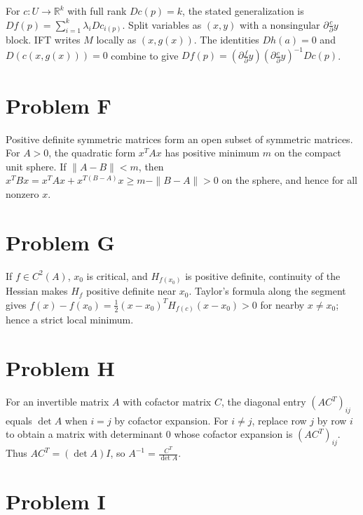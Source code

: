 For \(c:U\rightarrow\mathbb{R}^{k}\) with full rank \(Dc(p) = k\), the stated generalization is \(Df(p) = \sum_{i = 1}^{k}\lambda_{i}Dc_{i{(p)}}\). Split variables as \(\left( {x,y} \right)\) with a nonsingular \(\partial\frac{c}{\partial}y\) block. IFT writes \(M\) locally as \(\left( {x,g(x)} \right)\). The identities \(Dh(a) = 0\) and \(D\left( {c\left( {x,g(x)} \right)} \right) = 0\) combine to give \(Df(p) = \left( {\partial\frac{f}{\partial}y} \right)\left( {\partial\frac{c}{\partial}y} \right)^{- 1}Dc(p)\).

\section{Problem F}

Positive definite symmetric matrices form an open subset of symmetric matrices. For \(A > 0\), the quadratic form \(x^{T}Ax\) has positive minimum \(m\) on the compact unit sphere. If \(\| A - B\| < m\), then \(x^{T}Bx = x^{T}Ax + x^{T{({B - A})}}x \geq m - \| B - A\| > 0\) on the sphere, and hence for all nonzero \(x\).

\section{Problem G}

If \(f \in C^{2}(A)\), \(x_{0}\) is critical, and \(H_{f{(x_{0})}}\) is positive definite, continuity of the Hessian makes \(H_{f}\) positive definite near \(x_{0}\). Taylor's formula along the segment gives \(f(x) - f\left( x_{0} \right) = \frac{1}{2}\left( {x - x_{0}} \right)^{T}H_{f{(c)}}\left( {x - x_{0}} \right) > 0\) for nearby \(x \neq x_{0}\); hence a strict local minimum.

\section{Problem H}

For an invertible matrix \(A\) with cofactor matrix \(C\), the diagonal entry \(\left( {AC^{T}} \right)_{ij}\) equals \(\det A\) when \(i = j\) by cofactor expansion. For \(i \neq j\), replace row \(j\) by row \(i\) to obtain a matrix with determinant \(0\) whose cofactor expansion is \(\left( {AC^{T}} \right)_{ij}\). Thus \(AC^{T} = \left( {\det A} \right)I\), so \(A^{- 1} = \frac{C^{T}}{\det A}\).

\section{Problem I}


